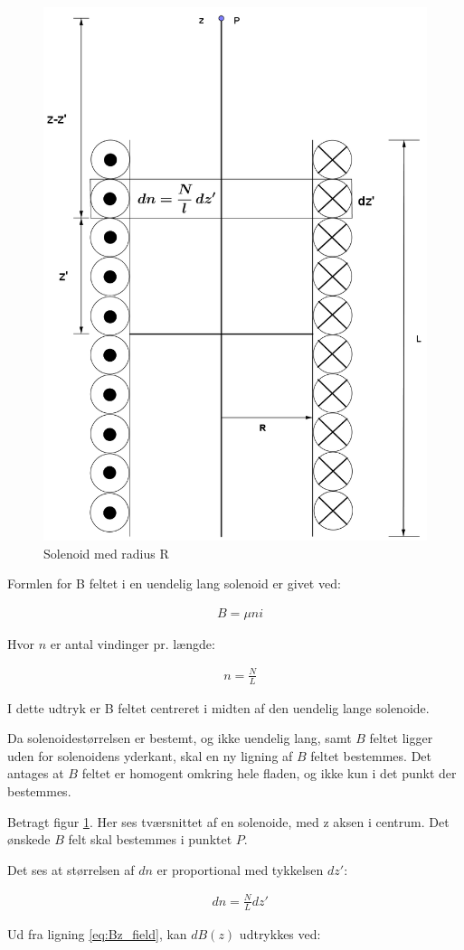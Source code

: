 \begin{figure}[h!]
	\centering
	\includegraphics[width=.5\textwidth]{billeder/B_felt2.png}
	\caption{Solenoid med radius R}
	\label{fig:spole_fig2}
\end{figure}

Formlen for B feltet i en uendelig lang solenoid er givet ved:

\begin{align}
	&B=\mu ni
\end{align}

Hvor $n$ er antal vindinger pr. længde:


\begin{align}
	&n=\frac{N}{L}
\end{align}

I dette udtryk er B feltet centreret i midten af den uendelig lange solenoide.

Da solenoidestørrelsen er bestemt, og ikke uendelig lang, samt $B$ feltet ligger uden for solenoidens yderkant, skal en ny ligning af $B$ feltet bestemmes.
Det antages at $B$ feltet er homogent omkring hele fladen, og ikke kun i det punkt der bestemmes.


Betragt figur \ref{fig:spole_fig2}. Her ses tværsnittet af en solenoide, med z aksen i centrum. Det ønskede $B$ felt skal bestemmes i punktet $P$.

Det ses at størrelsen af $dn$ er proportional med tykkelsen $dz'$:

\begin{align}
	&dn=\frac{N}{L} dz'
\end{align}



Ud fra ligning \ref{eq:Bz_field}, kan $dB(z)$ udtrykkes ved: 

